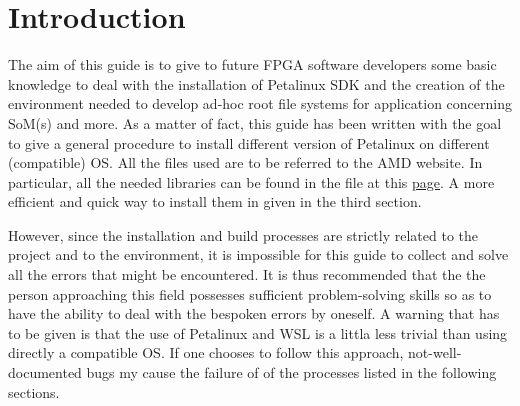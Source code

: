 \chapter{Introduction} \label{sec:intro}
The aim of this guide is to give to future FPGA software developers some basic knowledge to deal with the installation of Petalinux SDK and the creation of the environment needed to develop ad-hoc root file systems for application concerning SoM(s) and more. As a matter of fact, this guide has been written with the goal to give a general procedure to install different version of Petalinux on different (compatible) OS. All the files used are to be referred to the AMD website. In particular, all the needed libraries can be found in the file at this \href{https://adaptivesupport.amd.com/s/article/000034483?language=en_US}{page}. A more efficient and quick way to install them in given in the third section.

However, since the installation and build processes are strictly related to the project and to the environment, it is impossible for this guide to collect and solve all the errors that might be encountered. It is thus recommended that the the person approaching this field possesses sufficient problem-solving skills so as to have the ability to deal with the bespoken errors by oneself. A warning that has to be given is that the use of Petalinux and WSL is a littla less trivial than using directly a compatible OS. If one chooses to follow this approach, not-well-documented bugs my cause the failure of of the processes listed in the following sections. 